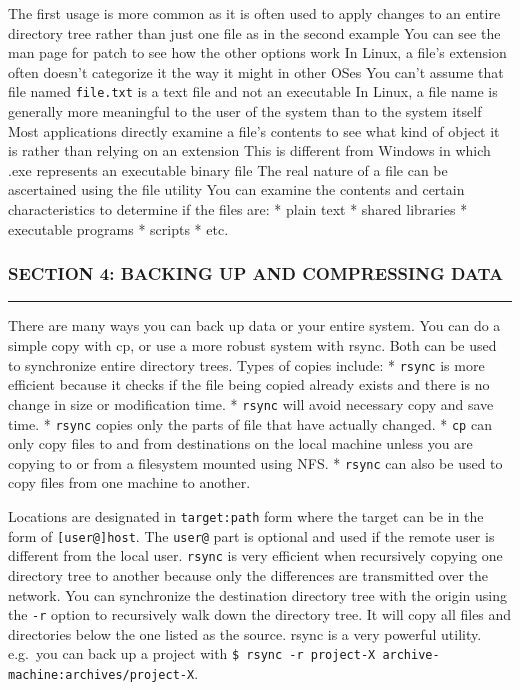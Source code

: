 The first usage is more common as it is often used to apply changes to
an entire directory tree rather than just one file as in the second
example You can see the man page for patch to see how the other options
work In Linux, a file's extension often doesn't categorize it the way it
might in other OSes You can't assume that file named \texttt{file.txt}
is a text file and not an executable In Linux, a file name is generally
more meaningful to the user of the system than to the system itself Most
applications directly examine a file's contents to see what kind of
object it is rather than relying on an extension This is different from
Windows in which .exe represents an executable binary file The real
nature of a file can be ascertained using the file utility You can
examine the contents and certain characteristics to determine if the
files are: * plain text * shared libraries * executable programs *
scripts * etc.

\subsubsection{SECTION 4: BACKING UP AND COMPRESSING
DATA}\label{section-4-backing-up-and-compressing-data}

\begin{center}\rule{3in}{0.4pt}\end{center}

There are many ways you can back up data or your entire system. You can
do a simple copy with cp, or use a more robust system with rsync. Both
can be used to synchronize entire directory trees. Types of copies
include: * \texttt{rsync} is more efficient because it checks if the
file being copied already exists and there is no change in size or
modification time. * \texttt{rsync} will avoid necessary copy and save
time. * \texttt{rsync} copies only the parts of file that have actually
changed. * \texttt{cp} can only copy files to and from destinations on
the local machine unless you are copying to or from a filesystem mounted
using NFS. * \texttt{rsync} can also be used to copy files from one
machine to another.

Locations are designated in \texttt{target:path} form where the target
can be in the form of \texttt{{[}user@{]}host}. The \texttt{user@} part
is optional and used if the remote user is different from the local
user. \texttt{rsync} is very efficient when recursively copying one
directory tree to another because only the differences are transmitted
over the network. You can synchronize the destination directory tree
with the origin using the \texttt{-r} option to recursively walk down
the directory tree. It will copy all files and directories below the one
listed as the source. rsync is a very powerful utility. e.g.~you can
back up a project with
\texttt{\$ rsync -r project-X archive-machine:archives/project-X}.

